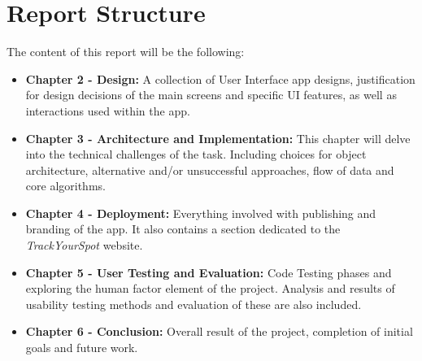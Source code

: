 \section{Report Structure}
The content of this report will be the following:
\begin{itemize}
    \item \textbf{Chapter 2 - Design: } A collection of User Interface app designs, justification for design decisions of the main screens and specific UI features, as well as interactions used within the app.
    \item \textbf{Chapter 3 - Architecture and Implementation: }This chapter will delve into the technical challenges of the task. Including choices for object architecture, alternative and/or unsuccessful approaches, flow of data and core algorithms.
    \item \textbf{Chapter 4 - Deployment: }Everything involved with publishing and branding of the app. It also contains a section dedicated to the \emph{TrackYourSpot} website.
    \item \textbf{Chapter 5 - User Testing and Evaluation: } Code Testing phases and exploring the human factor element of the project. Analysis and results of usability testing methods and evaluation of these are also included.
    \item \textbf{Chapter 6 - Conclusion: }Overall result of the project, completion of initial goals and future work.
\end{itemize}